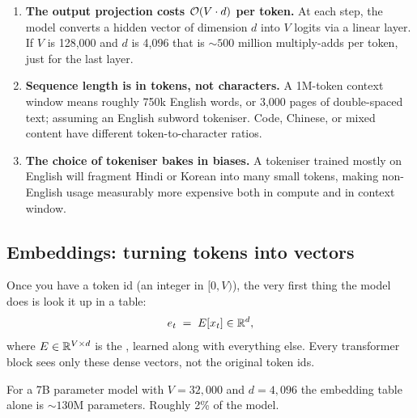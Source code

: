 \begin{enumerate}
\item \textbf{The output projection costs \(\mathcal{O}(V \cdot d)\) per token.}
At each step, the model converts a hidden vector of dimension \(d\) into
\(V\) logits via a linear layer. If \(V\) is 128,000 and \(d\) is 4,096
that is ${\sim}500$ million multiply-adds per token, just for the last layer.

\item \textbf{Sequence length is in tokens, not characters.} A 1M-token
context window means roughly 750k English words, or 3,000 pages of
double-spaced text; assuming an English subword tokeniser. Code, Chinese,
or mixed content have different token-to-character ratios.

\item \textbf{The choice of tokeniser bakes in biases.} A tokeniser trained
mostly on English will fragment Hindi or Korean into many small tokens,
making non-English usage measurably more expensive both in compute and in
context window.
\end{enumerate}


\subsection{Embeddings: turning tokens into vectors}

Once you have a token id (an integer in \([0, V)\)), the very first thing the
model does is look it up in a table:
\begin{equation}
  e_t \;=\; E[x_t] \in \mathbb{R}^{d},
\end{equation}
where \(E \in \mathbb{R}^{V \times d}\) is the , learned along
with everything else. Every transformer block sees only these dense vectors,
not the original token ids.

For a 7B parameter model with \(V = 32{,}000\) and \(d = 4{,}096\) the
embedding table alone is ${\sim}130$M parameters. Roughly 2\% of the
model.

